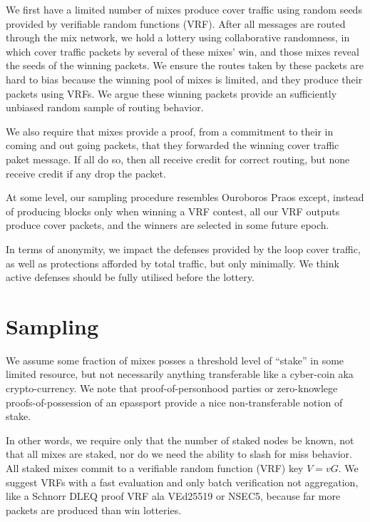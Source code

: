 ﻿\documentclass{sig-alternate-hotpets}
\begin{document}
We first have a limited number of mixes produce cover traffic using random seeds provided by verifiable random functions (VRF). 
After all messages are routed through the mix network, we hold a lottery using collaborative randomness, in which cover traffic packets by several of these mixes’ win, and those mixes reveal the seeds of the winning packets. 
We ensure the routes taken by these packets are hard to bias because the winning pool of mixes is limited, and they produce their packets using VRFs.  
We argue these winning packets provide an sufficiently unbiased random sample of routing behavior.

We also require that mixes provide a proof, from a commitment to their in coming and out going packets, that they forwarded the winning cover traffic paket message.  
If all do so, then all receive credit for correct routing, but none receive credit if any drop the packet.

At some level, our sampling procedure resembles Ouroboros Praos \cite{OuroborosPraos} except, instead of producing blocks only when winning a VRF contest, all our VRF outputs produce cover packets, and the winners are selected in some future epoch.  

In terms of anonymity, we impact the defenses provided by the loop cover traffic, as well as protections afforded by total traffic, but only minimally.  We think active defenses should be fully utilised before the lottery.

\section{Sampling} %

We assume some fraction of mixes posses a threshold level of ``stake'' in some limited resource, but not necessarily anything transferable like a cyber-coin aka crypto-currency.  We note that proof-of-personhood parties \cite{PoP} or zero-knowlege proofs-of-possession of an epassport provide a nice non-transferable notion of stake. 

In other words, we require only that the number of staked nodes be known, not that all mixes are staked, nor do we need the ability to slash for miss behavior.  
All staked mixes commit to a verifiable random function (VRF) key $V = v G$.  We suggest VRFs with a fast evaluation and only batch verification not aggregation, like a Schnorr DLEQ proof VRF ala VEd25519 or NSEC5, because far more packets are produced than win lotteries.  
\end{document}
